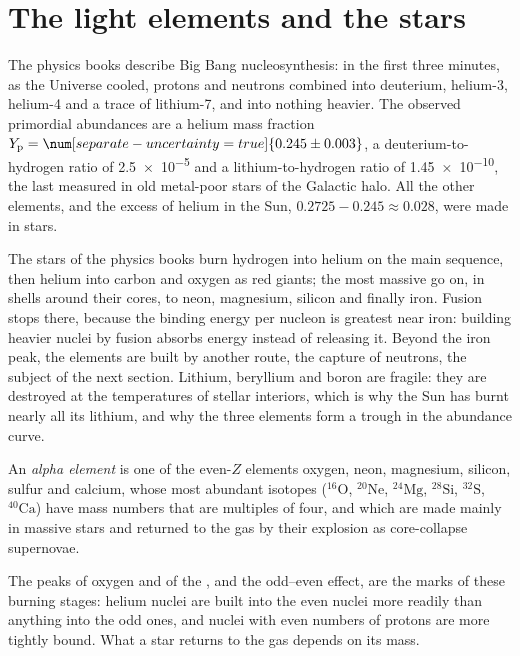 \section{The light elements and the stars}\label{sec:b3:origin-of-elements:stars}

The physics books describe Big Bang nucleosynthesis: in the first three
minutes, as the Universe cooled, protons and neutrons combined into
deuterium, helium-3, helium-4 and a trace of lithium-7, and into nothing
heavier. The observed primordial abundances are a helium mass fraction
$Y_\mathrm{p} = \num[separate-uncertainty=true]{0.245 \pm 0.003}$, a
deuterium-to-hydrogen ratio of \num{2.5e-5} and a lithium-to-hydrogen
ratio of \num{1.45e-10}, the last measured in old metal-poor stars of
the Galactic halo. All the other elements, and the excess of helium in
the Sun, $0.2725 - 0.245 \approx 0.028$, were made in stars.

The stars of the physics books burn hydrogen into helium on the main
sequence, then helium into carbon and oxygen as red giants; the most
massive go on, in shells around their cores, to neon, magnesium,
silicon and finally iron. Fusion stops there, because the binding energy
per nucleon is greatest near iron: building heavier nuclei by fusion
absorbs energy instead of releasing it. Beyond the iron peak, the
elements are built by another route, the capture of neutrons, the
subject of the next section. Lithium, beryllium and boron are fragile:
they are destroyed at the temperatures of stellar interiors, which is
why the Sun has burnt nearly all its lithium, and why the three elements
form a trough in the abundance curve.

\begin{definition}\label{def:b3:origin-of-elements:alpha}
An \emph{alpha element} is one of the even-$Z$
elements oxygen, neon, magnesium, silicon, sulfur and calcium, whose
most abundant isotopes ($^{16}\mathrm{O}$, $^{20}\mathrm{Ne}$,
$^{24}\mathrm{Mg}$, $^{28}\mathrm{Si}$, $^{32}\mathrm{S}$,
$^{40}\mathrm{Ca}$) have mass numbers that are multiples of four, and
which are made mainly in massive stars and returned to the gas by their
explosion as core-collapse supernovae.
\end{definition}

The peaks of oxygen and of the , and the odd--even effect,
are the marks of these burning stages: helium nuclei are built into the
even nuclei more readily than anything into the odd ones, and nuclei
with even numbers of protons are more tightly bound. What a star returns
to the gas depends on its mass.

